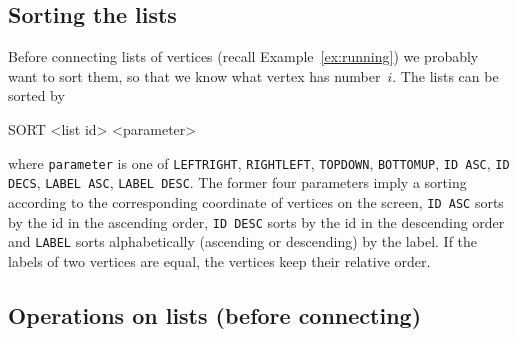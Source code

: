 \subsection{Sorting the lists}

Before connecting lists of vertices (recall Example~\ref{ex:running})
we probably want to sort them, so that we know what vertex has
number~$i$. The lists can be sorted by
\\\begin{tcolorbox}[colback=lightpink]
  SORT <list id> <parameter>
\end{tcolorbox}%
where \texttt{parameter} is one of \texttt{LEFTRIGHT},
\texttt{RIGHTLEFT}, \texttt{TOPDOWN}, \texttt{BOTTOMUP}, \texttt{ID
  ASC}, \texttt{ID DECS}, \texttt{LABEL ASC}, \texttt{LABEL DESC}. The
former four parameters imply a sorting according to the corresponding
coordinate of vertices on the screen, \texttt{ID ASC} sorts by the id
in  the ascending order, \texttt{ID DESC} sorts by the id
in  the descending order and \texttt{LABEL} sorts alphabetically
(ascending or descending) by the label. If the labels of two vertices
are equal, the vertices keep their relative order.

\subsection{Operations on lists (before connecting)}

